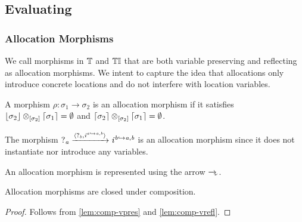 
\subsection{Evaluating}

\subsubsection{Allocation Morphisms}

We call morphisms in $\mathbb{T}$ and ${\mathbb{T}\mathbb{I}}$ that are both variable preserving and reflecting as allocation morphisms.
We intent to capture the idea that allocations only introduce concrete locations and do not interfere with location variables.

\begin{definition}
    A morphism $\rho : \sigma_1 \to \sigma_2$ is an allocation morphism if it satisfies 
        $\lfloor\sigma_2\rfloor \otimes_{[\sigma_2]} \lceil\sigma_1\rceil = \emptyset$ and
        $\lceil\sigma_2\rceil \otimes_{[\sigma_2]} \lceil\sigma_1\rceil = \emptyset$.
\end{definition}
\begin{example}
    The morphism $?_{\mathit{a}} \xrightarrow{\langle?_{\mathit{b}}, \mathit{i}^{\mathit{a} \hookrightarrow \mathit{a},\mathit{b}}\rangle} \mathit{i}^{\mathit{b} \hookrightarrow \mathit{a},\mathit{b}}$ is an allocation morphism since it does not instantiate nor introduce any variables.
\end{example}

\begin{notation}
    An allocation morphism is represented using the arrow $\ato$.
\end{notation}

\begin{lemma}\label{lem:comp-alloc}
    Allocation morphisms are closed under composition.
\end{lemma}
\begin{proof}
    Follows from \cref{lem:comp-vpres} and \cref{lem:comp-vrefl}.
\end{proof}

